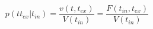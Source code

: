 \begin{equation}
p(tt_{ex}|t_{in})  = \frac{v(t,t_{ex})}{V(t_{in})}= \frac{F(t_{in},t_{ex})}{V(t_{in})}
\end{equation}